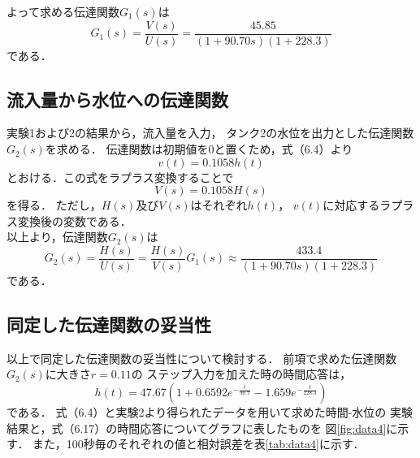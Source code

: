 \documentclass[11pt,a4paper]{jsarticle}
\begin{document}
    よって求める伝達関数$G_1(s)$は
    \begin{equation}
      G_1(s) = \frac{V(s)}{U(s)} = \frac{45.85}{(1 + 90.70 s)(1 + 228.3)}
    \end{equation}
    である．\\
    
  \subsection{流入量から水位への伝達関数}
    実験1および2の結果から，流入量を入力，
    タンク2の水位を出力とした伝達関数$G_2(s)$を求める．
    伝達関数は初期値を0と置くため，式（6.4）より
    \begin{equation}
      v(t) = 0.1058 h(t)
    \end{equation}
    とおける．この式をラプラス変換することで
    \begin{equation}
      V(s) = 0.1058 H(s)
    \end{equation}
    を得る．
    ただし，$H(s)$及び$V(s)$はそれぞれ$h(t)$，
    $v(t)$に対応するラプラス変換後の変数である．\\
    以上より，伝達関数$G_2(s)$は
    \begin{equation}
      G_2(s) = \frac{H(s)}{U(s)} = \frac{H(s)}{V(s)} G_1(s)
             \approx \frac{433.4}{(1 + 90.70 s)(1 + 228.3)}
    \end{equation}
    である．
    
  \subsection{同定した伝達関数の妥当性}
    以上で同定した伝達関数の妥当性について検討する．
    前項で求めた伝達関数$G_2(s)$に大きさ$r = 0.11$の
    ステップ入力を加えた時の時間応答は，
    \begin{equation}
      h(t) = 47.67 (1 + 0.6592 e^{- \frac{t}{90.7}} - 1.659 e^{- \frac{t}{228.3}})
    \end{equation}
    である．
    式（6.4）と実験2より得られたデータを用いて求めた時間-水位の
    実験結果と，式（6.17）の時間応答についてグラフに表したものを
    図\ref{fig:data4}に示す．
    また，100秒毎のそれぞれの値と相対誤差を表\ref{tab:data4}に示す．\\
\end{document}
